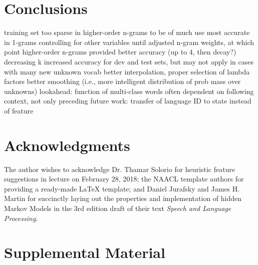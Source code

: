 \documentclass[11pt,a4paper]{article}
\begin{document}
\section{Conclusions}

training set too sparse in higher-order n-grams to be of much use
most accurate in 1-grams controlling for other variables until adjusted n-gram weights, at which point higher-order n-grams provided better accuracy (up to 4, then decay?)
decreasing k increased accuracy for dev and test sets, but may not apply in cases with many new unknown vocab
better interpolation, proper selection of lambda factors
better smoothing (i.e., more intelligent distribution of prob mass over unknowns)
lookahead: function of multi-class words often dependent on following context, not only preceding
future work: transfer of language ID to state instead of feature

\section*{Acknowledgments}

The author wishes to acknowledge Dr. Thamar Solorio for heuristic feature suggestions in
lecture on February 28, 2018; the NAACL template authors for providing a ready-made
{\LaTeX} template; and Daniel Jurafsky and James H. Martin for succinctly laying out the
properties and implementation of hidden Markov Models in the 3rd edition draft of their
text \emph{Speech and Language Processing}.




\appendix

\section{Supplemental Material}
\label{sec:supplemental}
\end{document}
